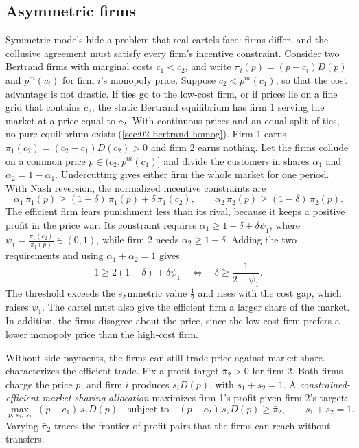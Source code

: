 \subsection{Asymmetric firms}\label{sec:12-asymmetries}

Symmetric models hide a problem that real cartels face: firms differ, and the collusive agreement must satisfy every
firm's incentive constraint. Consider two Bertrand firms with marginal costs $c_1 < c_2$, and write
$\pi_i(p) = (p - c_i)D(p)$ and $p^m(c_i)$ for firm $i$'s monopoly price. Suppose $c_2 < p^m(c_1)$, so that the cost
advantage is not drastic. If ties go to the low-cost firm, or if prices lie on a fine grid that contains $c_2$, the
static Bertrand equilibrium has firm 1 serving the market at a price equal to $c_2$. With continuous prices and an
equal split of ties, no pure equilibrium exists (\cref{sec:02-bertrand-homog}). Firm 1 earns $\pi_1(c_2) = (c_2 - c_1)D(c_2) > 0$ and firm 2 earns nothing. Let the firms collude on a common
price $p \in (c_2, p^m(c_1)]$ and divide the customers in shares $\alpha_1$ and $\alpha_2 = 1 - \alpha_1$. Undercutting
gives either firm the whole market for one period. With Nash reversion, the normalized incentive constraints are
\begin{equation}\label{eq:12-asym-cost}
\alpha_1\,\pi_1(p) \ge (1 - \delta)\,\pi_1(p) + \delta\,\pi_1(c_2) ,
\qquad
\alpha_2\,\pi_2(p) \ge (1 - \delta)\,\pi_2(p) .
\end{equation}
The efficient firm fears punishment less than its rival, because it keeps a positive profit in the price war. Its
constraint requires $\alpha_1 \ge 1 - \delta + \delta\psi_1$, where $\psi_1 = \frac{\pi_1(c_2)}{\pi_1(p)} \in (0, 1)$,
while firm 2 needs $\alpha_2 \ge 1 - \delta$. Adding the two requirements and using $\alpha_1 + \alpha_2 = 1$ gives
\begin{equation*}
1 \ge 2(1 - \delta) + \delta\psi_1
\quad\Longleftrightarrow\quad
\delta \ge \frac{1}{2 - \psi_1} .
\end{equation*}
The threshold exceeds the symmetric value $\frac{1}{2}$ and rises with the cost gap, which raises $\psi_1$. The cartel
must also give the efficient firm a larger share of the market. In addition, the firms disagree about the price,
since the low-cost firm prefers a lower monopoly price than the high-cost firm.

Without side payments, the firms can still trade price against market share. \citet[section~6.3.2.4,
Exercises~6.1 and~6.5]{Tirole1988} characterizes the efficient trade. Fix a profit target $\bar\pi_2 > 0$ for firm 2.
Both firms charge the price $p$, and firm $i$ produces $s_iD(p)$, with $s_1 + s_2 = 1$. A \emph{constrained-efficient
market-sharing allocation} maximizes firm 1's profit given firm 2's target:
\begin{equation}\label{eq:12-asym-frontier}
\max_{p,\, s_1,\, s_2}\; (p - c_1)\,s_1D(p)
\quad\text{subject to}\quad (p - c_2)\,s_2D(p) \ge \bar\pi_2 , \qquad s_1 + s_2 = 1 .
\end{equation}
Varying $\bar\pi_2$ traces the frontier of profit pairs that the firms can reach without transfers.

